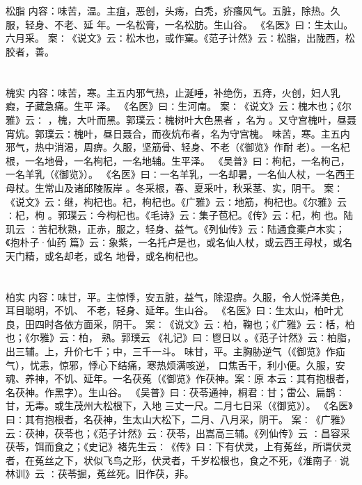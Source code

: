 \documentclass[12pt,UTF8]{ctexbook}
\begin{document}
\section{}松脂
内容：味苦，温。主疽，恶创，头疡，白秃，疥瘙风气。五脏，除热。久服，轻身、不老、延 
年。一名松膏，一名松肪。生山谷。 
《名医》曰∶生太山。六月采。 
案∶《说文》云∶松木也，或作窠。《范子计然》云∶松脂，出陇西，松胶者，善。 


\section{}槐实
内容：味苦，寒。主五内邪气热，止涎唾，补绝伤，五痔，火创，妇人乳瘕，子藏急痛。生平 
泽。 
《名医》曰∶生河南。 
案∶《说文》云∶槐木也；《尔雅》云∶ ，槐，大叶而黑。郭璞云∶槐树叶大色黑者 
，名为 。又守宫槐叶，昼聂宵炕。郭璞云∶槐叶，昼日聂合，而夜炕布者，名为守宫槐。 
味苦，寒。主五内邪气，热中消渴，周痹。久服，坚筋骨、轻身、不老（《御览》作耐 
老）。一名杞根，一名地骨，一名枸杞，一名地辅。生平泽。 
《吴普》曰∶枸杞，一名枸己，一名羊乳（《御览》）。 
《名医》曰∶一名羊乳，一名却暑，一名仙人杖，一名西王母杖。生常山及诸邱陵阪岸 
。冬采根，春、夏采叶，秋采茎、实，阴干。 
案∶《说文》云∶继，枸杞也。杞，枸杞也。《广雅》云∶地筋，枸杞也。《尔雅》云 
∶杞，枸 。郭璞云∶今枸杞也。《毛诗》云∶集子苞杞。《传》云∶杞，枸 也。陆玑云 
∶苦杞秋熟，正赤，服之，轻身、益气。《列仙传》云∶陆通食橐卢木实；《抱朴子·仙药 
篇》云∶象紫，一名托卢是也，或名仙人杖，或云西王母杖，或名天门精，或名却老，或名 
地骨，或名枸杞也。 


\section{}柏实
内容：味甘，平。主惊悸，安五脏，益气，除湿痹。久服，令人悦泽美色，耳目聪明，不饥、 
不老，轻身、延年。生山谷。 
《名医》曰∶生太山，柏叶尤良，田四时各依方面采，阴干。 
案∶《说文》云∶柏，鞠也；《广雅》云∶栝，柏也；《尔雅》云∶柏， 熟。郭璞云 
《礼记》曰∶鬯日以 。《范子计然》云∶柏脂，出三辅。上，升价七千；中，三千一斗。 
味甘，平。主胸胁逆气（《御览》作疝气），忧恚，惊邪，悸心下结痛，寒热烦满咳逆， 
口焦舌干，利小便。久服，安魂、养神，不饥、延年。一名茯菟（《御览》作茯神。案∶原 
本云∶其有抱根者，名茯神。作黑字）。生山谷。 
《吴普》曰∶茯苓通神，桐君∶甘；雷公、扁鹊∶甘，无毒。或生茂州大松根下，入地 
三丈一尺。二月七日采（《御览》）。 
《名医》曰∶其有抱根者，名茯神，生太山大松下，二月、八月采，阴干。 
案∶《广雅》云∶茯神，茯苓也；《范子计然》云∶茯苓，出嵩高三辅。《列仙传》云 
∶昌容采茯苓，饵而食之；《史记》褚先生云∶《传》曰∶下有伏灵，上有菟丝，所谓伏灵 
者，在菟丝之下，状似飞鸟之形，伏灵者，千岁松根也，食之不死，《淮南子·说林训》云 
∶茯苓掘，菟丝死。旧作茯，非。 
\end{document}
